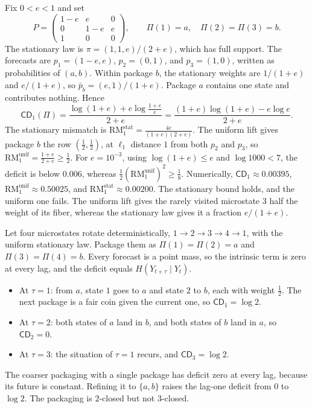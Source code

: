 \begin{example}\label{ex:uniform-lift}
Fix $0<e<1$ and set
\[
P=\begin{pmatrix}1-e&e&0\\0&1-e&e\\1&0&0\end{pmatrix},
\qquad
\Pi(1)=a,\quad \Pi(2)=\Pi(3)=b .
\]
The stationary law is $\pi=(1,1,e)/(2+e)$, which has full support. The forecasts are $p_1=(1-e,e)$, $p_2=(0,1)$, and $p_3=(1,0)$, written as probabilities of $(a,b)$. Within package $b$, the stationary weights are $1/(1+e)$ and $e/(1+e)$, so $\bar p_b=(e,1)/(1+e)$. Package $a$ contains one state and contributes nothing. Hence
\[
\mathsf{CD}_1(\Pi)=\frac{\log(1+e)+e\log\frac{1+e}{e}}{2+e}=\frac{(1+e)\log(1+e)-e\log e}{2+e}.
\]
The stationary mismatch is $\mathrm{RM}^{\mathrm{stat}}_1=\frac{4e}{(1+e)(2+e)}$. The uniform lift gives package $b$ the row $(\tfrac12,\tfrac12)$, at $\ell_1$ distance $1$ from both $p_2$ and $p_3$, so $\mathrm{RM}^{\mathrm{unif}}_1=\frac{1+e}{2+e}\ge\frac12$. For $e=10^{-3}$, using $\log(1+e)\le e$ and $\log 1000<7$, the deficit is below $0.006$, whereas $\tfrac12(\mathrm{RM}^{\mathrm{unif}}_1)^2\ge\tfrac18$. Numerically, $\mathsf{CD}_1\approx0.00395$, $\mathrm{RM}^{\mathrm{unif}}_1\approx0.50025$, and $\mathrm{RM}^{\mathrm{stat}}_1\approx0.00200$. The stationary bound holds, and the uniform one fails. The uniform lift gives the rarely visited microstate $3$ half the weight of its fiber, whereas the stationary law gives it a fraction $e/(1+e)$.
\end{example}

\begin{example}\label{ex:four-cycle}
Let four microstates rotate deterministically, $1\to2\to3\to4\to1$, with the uniform stationary law. Package them as $\Pi(1)=\Pi(2)=a$ and $\Pi(3)=\Pi(4)=b$. Every forecast is a point mass, so the intrinsic term is zero at every lag, and the deficit equals $H(Y_{t+\tau}\mid Y_t)$.
\begin{itemize}
\item At $\tau=1$: from $a$, state $1$ goes to $a$ and state $2$ to $b$, each with weight $\tfrac12$. The next package is a fair coin given the current one, so $\mathsf{CD}_1=\log2$.
\item At $\tau=2$: both states of $a$ land in $b$, and both states of $b$ land in $a$, so $\mathsf{CD}_2=0$.
\item At $\tau=3$: the situation of $\tau=1$ recurs, and $\mathsf{CD}_3=\log2$.
\end{itemize}
The coarser packaging with a single package has deficit zero at every lag, because its future is constant. Refining it to $\{a,b\}$ raises the lag-one deficit from $0$ to $\log2$. The packaging is $2$-closed but not $3$-closed.
\end{example}

